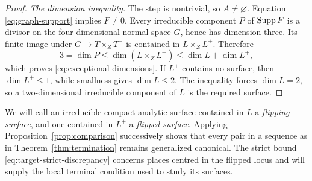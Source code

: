 \begin{proof}
\emph{The dimension inequality.}
The step is nontrivial, so $A\neq\varnothing$.  Equation
\eqref{eq:graph-support} implies $F\neq0$.  Every irreducible component
$P$ of $\operatorname{Supp} F$ is a divisor on the four-dimensional normal space
$G$, hence has dimension three.  Its finite image under
$G\to T\times_ZT^+$ is contained in $L\times_ZL^+$.  Therefore
\[
 3=\dim P\leq\dim(L\times_ZL^+)\leq\dim L+\dim L^+,
\]
which proves \eqref{eq:exceptional-dimensions}.  If $L^+$ contains no
surface, then $\dim L^+\leq1$, while smallness gives $\dim L\leq2$.
The inequality forces $\dim L=2$, so a two-dimensional irreducible
component of $L$ is the required surface.
\end{proof}

We will call an irreducible compact analytic surface contained in $L$
a \emph{flipping surface}, and one contained in $L^+$ a
\emph{flipped surface}.  Applying Proposition~\ref{prop:comparison}
successively shows that every pair in a sequence as in
Theorem~\ref{thm:termination} remains generalized canonical. The
strict bound \eqref{eq:target-strict-discrepancy} concerns places
centred in the flipped locus and will supply the local terminal
condition used to study its surfaces.
